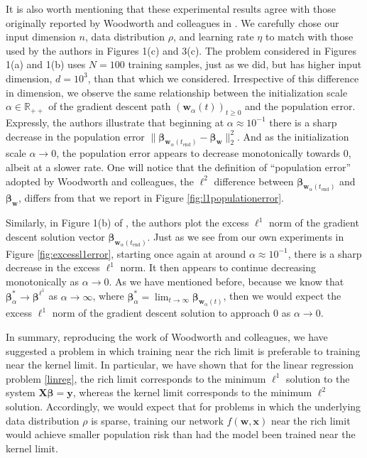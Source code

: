 \documentclass{article}
\begin{document}
It is also worth mentioning that these experimental results agree with those originally reported by Woodworth and colleagues in \cite{woodworth2020kernel}. We carefully chose our input dimension $n$, data distribution $\rho$, and learning rate $\eta$ to match with those used by the authors in Figures 1(c) and 3(c). The problem considered in Figures 1(a) and 1(b) uses $N=100$ training samples, just as we did, but has higher input dimension, $d=10^3$, than that which we considered. Irrespective of this difference in dimension, we observe the same relationship between the initialization scale $\alpha \in \mathbb{R}_{++}$ of the gradient descent path $(\boldsymbol{w}_{\alpha}(t))_{t \geq 0}$ and the population error. Expressly, the authors illustrate that beginning at $\alpha \approx 10^{-1}$ there is a sharp decrease in the population error $\| \boldsymbol{\beta}_{\boldsymbol{w}_{\alpha}(t_{\text{end}})} - \boldsymbol{\beta}_{\boldsymbol{w}} \|_2^2$. And as the initialization scale $\alpha \rightarrow 0$, the population error appears to decrease monotonically towards $0$, albeit at a slower rate. One will notice that the definition of \enquote{population error} adopted by Woodworth and colleagues, the $\ell^2$ difference between $\boldsymbol{\beta}_{\boldsymbol{w}_{\alpha}(t_{\text{end}})}$ and $\boldsymbol{\beta}_{\boldsymbol{w}}$, differs from that we report in Figure \ref{fig:l1populationerror}. 

Similarly, in Figure 1(b) of \cite{woodworth2020kernel}, the authors plot the excess $\ell^1$ norm of the gradient descent solution vector $\boldsymbol{\beta}_{\boldsymbol{w}_{\alpha}(t_{\text{end}})}$. Just as we see from our own experiments in Figure \ref{fig:excessl1error}, starting once again at around $\alpha \approx 10^{-1}$, there is a sharp decrease in the excess $\ell^1$ norm. It then appears to continue decreasing monotonically as $\alpha \rightarrow 0$. As we have mentioned before, because we know that $\boldsymbol{\beta}_{\alpha}^* \rightarrow \boldsymbol{\beta}^{\ell^1}$ as $\alpha \rightarrow \infty$, where $\boldsymbol{\beta}_{\alpha}^* = \lim_{t \to \infty} \boldsymbol{\beta}_{\boldsymbol{w}_{\alpha}(t)}$, then we would expect the excess $\ell^1$ norm of the gradient descent solution to approach $0$ as $\alpha \rightarrow 0$.

In summary, reproducing the work of Woodworth and colleagues, we have suggested a problem in which training near the rich limit is preferable to training near the kernel limit. In particular, we have shown that for the linear regression problem \ref{linreg}, the rich limit corresponds to the minimum $\ell^1$ solution to the system $\boldsymbol{X}\boldsymbol{\beta} = \boldsymbol{y}$, whereas the kernel limit corresponds to the minimum $\ell^2$ solution. Accordingly, we would expect that for problems in which the underlying data distribution $\rho$ is sparse, training our network $f(\boldsymbol{w}, \boldsymbol{x})$ near the rich limit would achieve smaller population risk than had the model been trained near the kernel limit.
\end{document}
